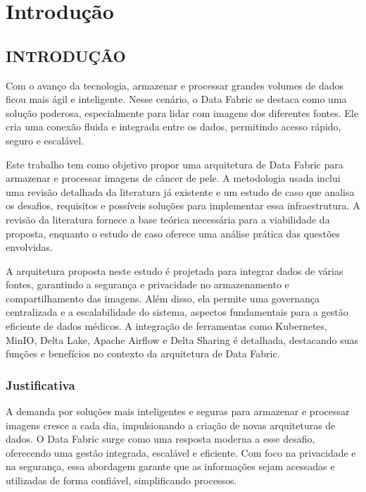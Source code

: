 \chapter[Introdução]{Introdução}

\section{INTRODUÇÃO}

Com o avanço da tecnologia, armazenar e processar grandes volumes de dados ficou mais ágil e inteligente. Nesse cenário, o Data Fabric se destaca como uma solução poderosa, especialmente para lidar com imagens dos diferentes fontes. Ele cria uma conexão fluida e integrada entre os dados, permitindo acesso rápido, seguro e escalável. 

Este trabalho tem como objetivo propor uma arquitetura de Data Fabric para armazenar e processar imagens de câncer de pele. A metodologia usada inclui uma revisão detalhada da literatura já existente e um estudo de caso que analisa os desafios, requisitos e possíveis soluções para implementar essa infraestrutura. A revisão da literatura fornece a base teórica necessária para a viabilidade da proposta, enquanto o estudo de caso oferece uma análise prática das questões envolvidas.

A arquitetura proposta neste estudo é projetada para integrar dados de várias fontes, garantindo a segurança e privacidade no armazenamento e compartilhamento das imagens. Além disso, ela permite uma governança centralizada e a escalabilidade do sistema, aspectos fundamentais para a gestão eficiente de dados médicos. A integração de ferramentas como Kubernetes, MinIO, Delta Lake, Apache Airflow e Delta Sharing é detalhada, destacando suas funções e benefícios no contexto da arquitetura de Data Fabric.



\subsection{Justificativa}

A demanda por soluções mais inteligentes e seguras para armazenar e processar imagens cresce a cada dia, impulsionando a criação de novas arquiteturas de dados. O Data Fabric surge como uma resposta moderna a esse desafio, oferecendo uma gestão integrada, escalável e eficiente. Com foco na privacidade e na segurança, essa abordagem garante que as informações sejam acessadas e utilizadas de forma confiável, simplificando processos.


